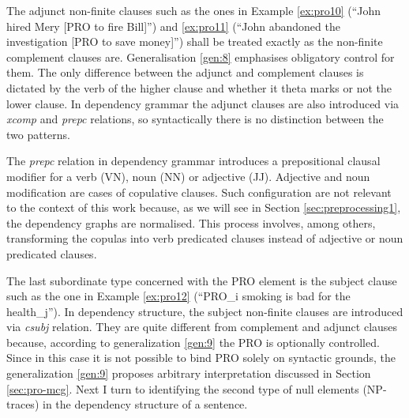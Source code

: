 The adjunct non-finite clauses such as the ones in Example \ref{ex:pro10} (``John hired Mery [PRO to fire Bill]'') and \ref{ex:pro11} (``John abandoned the investigation [PRO to save money]'') shall be treated exactly as the non-finite complement clauses are. Generalisation \ref{gen:8} emphasises obligatory control for them. The only difference between the adjunct and complement clauses is dictated by the verb of the higher clause and whether it theta marks or not the lower clause. In dependency grammar the adjunct clauses are also introduced via \textit{xcomp} and \textit{prepc} relations, so syntactically there is no distinction between the two patterns.


The \textit{prepc} relation in dependency grammar introduces a prepositional clausal modifier for a verb (VN), noun (NN) or adjective (JJ). Adjective and noun modification are cases of copulative clauses. Such configuration are not relevant to the context of this work  because, as we will see in Section \ref{sec:preprocessing1}, the dependency graphs are normalised. This process involves, among others, transforming the copulas into verb predicated clauses instead of adjective or noun predicated clauses. 


The last subordinate type concerned with the PRO element is the subject clause such as the one in Example \ref{ex:pro12} (``PRO_i smoking is bad for the health_j''). In dependency structure, the subject non-finite clauses are introduced via \textit{csubj} relation. They are quite different from complement and adjunct clauses because, according to generalization \ref{gen:9} the PRO is optionally controlled. Since in this case it is not possible to bind PRO solely on syntactic grounds, the generalization \ref{gen:9} proposes arbitrary interpretation discussed in Section \ref{sec:pro-mcg}. Next I turn to identifying the second type of null elements (NP-traces) in the dependency structure of a sentence.


